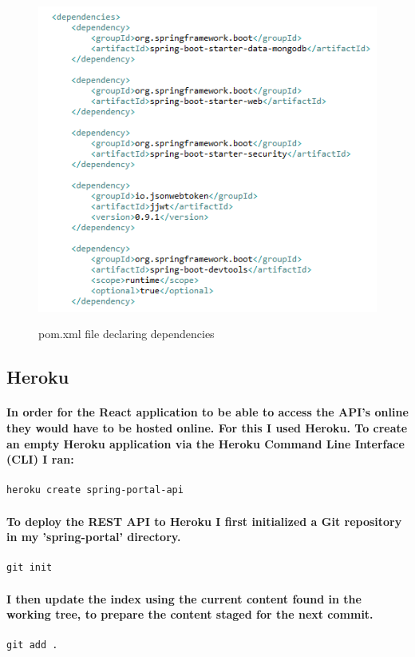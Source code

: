 \begin{figure}[ht]
    \centering
    \includegraphics[scale=0.6]{Images/pom.png} 
    \label{pom_label}
    \caption{pom.xml file declaring dependencies}
\end{figure}

\subsection{Heroku}
\paragraph{In order for the React application to be able to access the API's online they would have to be hosted online. For this I used Heroku. To create an empty Heroku application via the Heroku Command Line Interface (CLI) I ran:}
\begin{verbatim}
heroku create spring-portal-api
\end{verbatim}
\paragraph{To deploy the REST API to Heroku I first initialized a Git repository in my 'spring-portal' directory.}
\begin{verbatim}
git init
\end{verbatim}
\paragraph{I then update the index using the current content found in the working tree, to prepare the content staged for the next commit.}
\begin{verbatim}
git add .
\end{verbatim}
